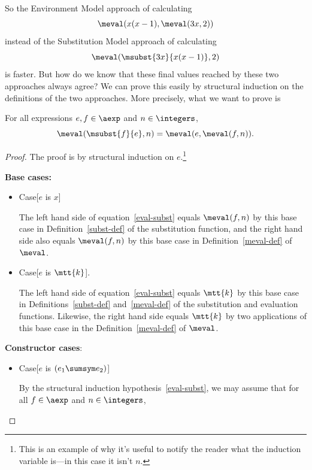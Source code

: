\begin{definition}
So the Environment Model approach of calculating
\[
\meval(x(x-1), \meval(3x,2))
\]
instead of the Substitution Model approach of calculating
\[
\meval(\msubst{3x}{x(x-1)},2)
\]
is faster.  But how do we know that these final values reached by these
two approaches always agree?  We can prove this easily by structural
induction on the definitions of the two approaches.  More precisely, what
we want to prove is

\begin{theorem}\label{environments}
For all expressions $e,f \in \aexp$ and $n \in \integers$,
\begin{equation}\label{eval-subst}
\meval(\msubst{f}{e},n) = \meval(e, \meval(f,n)).
\end{equation}
\end{theorem}

\begin{proof}
The proof is by structural induction on $e$.\footnote{This is an example
of why it's useful to notify the reader what the induction variable is---in this case it isn't $n$.}

\textbf{Base cases:}
\begin{itemize}

\item Case[$e$ is $x$]

  The left hand side of equation~\eqref{eval-subst} equals $\meval(f,n)$
  by this base case in Definition~\ref{subst-def} of the substitution
  function, and the right hand side also equals $\meval(f,n)$ by this base
  case in Definition~\ref{meval-def} of $\meval$.


\item Case[$e$ is $\mtt{k}$].

  The left hand side of equation~\eqref{eval-subst} equals $\mtt{k}$ by
  this base case in Definitions~\ref{subst-def} and~\ref{meval-def} of
  the substitution and evaluation functions.  Likewise, the right hand
  side equals $\mtt{k}$ by two applications of this base case in the
  Definition~\ref{meval-def} of $\meval$.

\end{itemize}

\textbf{Constructor cases}:
\begin{itemize}

\item Case[$e$ is $(e_1 \sumsym e_2)$]

  By the structural induction hypothesis~\eqref{eval-subst}, we may assume
  that for all $f \in \aexp$ and $n \in \integers$,


\end{itemize}
\end{proof}
\end{definition}
